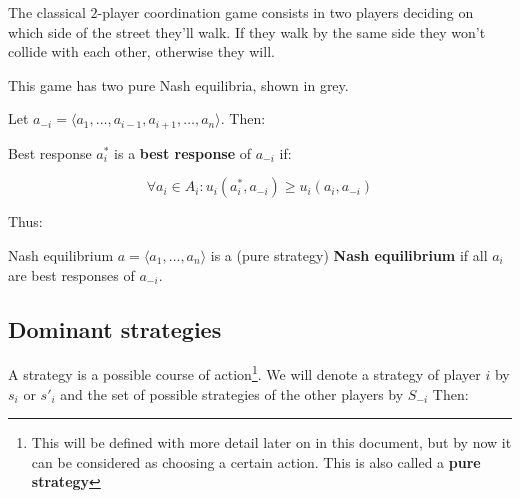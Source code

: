 \documentclass{tufte-handout}
\begin{document}
\begin{marginfigure}

\begin{center}
\end{center}
\vspace*{2mm}

The classical $2$-player coordination game consists in
two players deciding on which side of the street they'll walk.
If they walk by the same side they won't collide with each other,
otherwise they will.

\vspace*{2mm}

This game has two pure Nash equilibria, shown in grey.
\end{marginfigure}


Let $a_{-i} = \langle a_1, \dots, a_{i-1}, a_{i+1}, \dots, a_n \rangle$.
Then:

\begin{definition}{Best response}
$a_i^* $ is a \textbf{best response} of $a_{-i}$ if:

$$\forall a_i \in A_i: u_i(a_i^*, a_{-i}) \geq u_i(a_i, a_{-i})$$
\end{definition}

Thus:

\begin{definition}{Nash equilibrium}
$a = \langle a_1, \dots, a_n \rangle$ is a (pure strategy)
\textbf{Nash equilibrium} if all $a_i$ are best responses of $a_{-i}$.
\end{definition}

\subsection{Dominant strategies}

A strategy is a possible course of action\footnote{This will be defined with
more detail later on in this document, but by now it can be considered as
choosing a certain action. This is also called a \textbf{pure strategy}}.
We will denote a strategy of player $i$ by $s_i$ or $s'_i$ and
the set of possible strategies of the other players by $S_{-i}$ Then:
\end{document}
